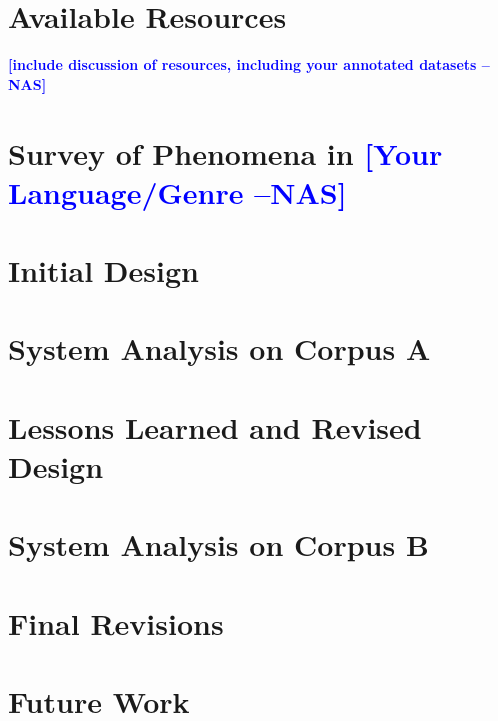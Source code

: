 \documentclass[11pt,letterpaper]{article}
\newcommand{\nascomment}[1]{\textcolor{blue}{\textbf{[#1 --NAS]}}}
\begin{document}
\section{Available Resources}

\nascomment{include discussion of resources, including your annotated datasets}

\section{Survey of Phenomena in \nascomment{Your Language/Genre}}

\section{Initial Design}

\section{System Analysis on Corpus A}

\section{Lessons Learned and Revised Design}

\section{System Analysis on Corpus B}

\section{Final Revisions}

\section{Future Work}







\label{lastpage}
\end{document}
